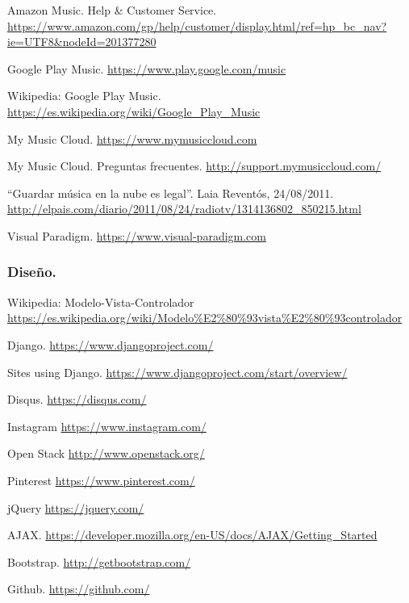  Amazon Music. Help \& Customer Service. \url{https://www.amazon.com/gp/help/customer/display.html/ref=hp_bc_nav?ie=UTF8&nodeId=201377280}

 Google Play Music. \url{https://www.play.google.com/music}

 Wikipedia: Google Play Music. \url{https://es.wikipedia.org/wiki/Google_Play_Music}

 My Music Cloud. \url{https://www.mymusiccloud.com}

 My Music Cloud. Preguntas frecuentes. \url{http://support.mymusiccloud.com/}

 ``Guardar música en la nube es legal''. Laia Reventós, 24/08/2011. \url{http://elpais.com/diario/2011/08/24/radiotv/1314136802_850215.html}

 Visual Paradigm. \url{https://www.visual-paradigm.com}

\subsubsection*{Diseño.}

 Wikipedia: Modelo-Vista-Controlador \url{https://es.wikipedia.org/wiki/Modelo%E2%80%93vista%E2%80%93controlador}

 Django. \url{https://www.djangoproject.com/}

 Sites using Django. \url{https://www.djangoproject.com/start/overview/}

 Disqus. \url{https://disqus.com/}

 Instagram \url{https://www.instagram.com/}

 Open Stack \url{http://www.openstack.org/}

 Pinterest \url{https://www.pinterest.com/}

 jQuery \url{https://jquery.com/}

 AJAX. \url{https://developer.mozilla.org/en-US/docs/AJAX/Getting_Started}

 Bootstrap. \url{http://getbootstrap.com/}

 Github. \url{https://github.com/}

